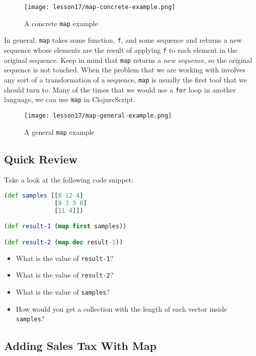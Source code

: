 \documentclass[10pt,twoside,openright]{memoir}
\begin{document}
\begin{figure}[H]
\caption{A concrete \texttt{map} example}
\centering
\texttt{[image: lesson17/map-concrete-example.png]}
\end{figure}

In general, \texttt{map} takes some function, \texttt{f}, and some
sequence and returns a new sequence whose elements are the result of
applying \texttt{f} to each element in the original sequence. Keep in
mind that \texttt{map} returns a \emph{new sequence}, so the original
sequence is not touched. When the problem that we are working with
involves any sort of a transformation of a sequence, \texttt{map} is
usually the first tool that we should turn to. Many of the times that we
would use a \texttt{for} loop in another language, we can use
\texttt{map} in ClojureScript.

\begin{figure}[H]
\caption{A general \texttt{map} example}
\centering
\texttt{[image: lesson17/map-general-example.png]}
\end{figure}


\subsection{Quick Review}


Take a look at the following code snippet:

\begin{lstlisting}[language=Clojure]
(def samples [[8 12 4]
              [9 3 3 6]
              [11 4]])

(def result-1 (map first samples))

(def result-2 (map dec result-1))
\end{lstlisting}

\begin{itemize}
\tightlist
\item
  What is the value of \texttt{result-1}?
\item
  What is the value of \texttt{result-2}?
\item
  What is the value of \texttt{samples}?
\item
  How would you get a collection with the length of each vector inside
  \texttt{samples}?
\end{itemize}


\subsection{Adding Sales Tax With Map}
\end{document}
